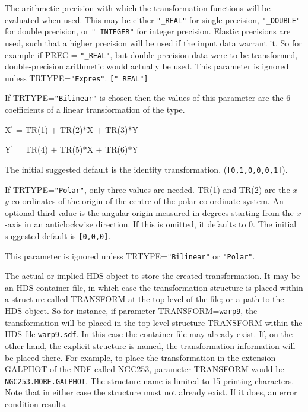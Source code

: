 \documentclass[twoside,11pt]{article}
\newcommand{\sstsubsection}[1]{ \item[{#1}] \mbox{} \\}
\renewcommand{\sstsubsection}[1]{\item[{#1}]}
\begin{document}
{{{         The arithmetic precision with which the transformation
         functions will be evaluated when used.  This may be either
         {\tt "\_REAL"} for single precision, {\tt "\_DOUBLE"} for
         double precision, or {\tt "\_INTEGER"} for integer precision.
         Elastic precisions are used, such that a higher precision will
         be used if the input
         data warrant it.  So for example if PREC = {\tt "\_REAL"}, but
         double-precision data were to be transformed, double-precision
         arithmetic would actually be used.  This parameter is
         ignored unless TRTYPE={\tt "Expres"}.  {\tt ["\_REAL"]}
      }
      \sstsubsection{
         TR( 6 ) = \_DOUBLE (Read)
      }{
         If TRTYPE={\tt "Bilinear"} is chosen then the values of this
         parameter are the 6 coefficients of a linear transformation of
         the type.
         \begin{description}
         \item X$^\prime$ = TR(1) $+$ TR(2)$*$X $+$ TR(3)$*$Y
         \item Y$^\prime$ = TR(4) $+$ TR(5)$*$X $+$ TR(6)$*$Y
         \end{description}
         The initial suggested default is the identity transformation.
         ({\tt [0,1,0,0,0,1]}).

         If TRTYPE={\tt "Polar"}, only three values are needed.  TR(1) and
         TR(2) are the $x$-$y$ co-ordinates of the origin of the centre of
         the polar co-ordinate system.  An optional third value is
         the angular origin measured in degrees starting from the
         $x$-axis in an anticlockwise direction.  If this is omitted, it
         defaults to 0.  The initial suggested default is {\tt [0,0,0]}.

         This parameter is ignored unless TRTYPE={\tt "Bilinear"} or
         {\tt "Polar"}.
      }
      \sstsubsection{
         TRANSFORM = TRN (Write)
      }{
         The actual or implied HDS object to store the created
         transformation.  It may be an HDS container file, in which
         case the transformation structure is placed within a structure
         called TRANSFORM at the top level of the file; or a path to
         the HDS object.  So for instance, if parameter
         TRANSFORM={\tt warp9}, the transformation will be placed in
         the top-level structure TRANSFORM within the HDS file
         {\tt warp9.sdf}.  In this case the container file may already
         exist.  If, on the other hand, the explicit structure is
         named, the transformation information will be placed there. 
         For example, to place the transformation in the extension
         GALPHOT of the NDF called NGC253, parameter TRANSFORM would be
         {\tt NGC253.MORE.GALPHOT}.  The structure name is limited to 15
         printing characters.  Note that in either case the structure
         must not already exist.  If it does, an error condition
         results.
 
}}}
\end{document}
